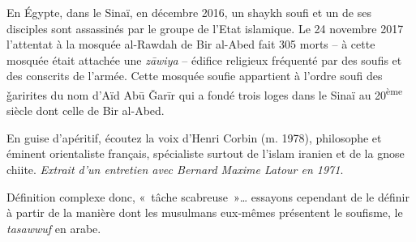 En Égypte, dans le Sinaï, en décembre 2016, un shaykh soufi et un de ses
disciples sont assassinés par le groupe de l'Etat islamique. Le 24
novembre 2017 l'attentat à la mosquée al-Rawdah de Bir al-Abed fait 305
morts -- à cette mosquée était attachée une \emph{zāwiya} -- édifice
religieux fréquenté par des soufis et des conscrits de l'armée. Cette
mosquée soufie appartient à l'ordre soufi des ǧarirites du nom d'Aïd Abū
Ǧarīr qui a fondé trois loges dans le Sinaï au 20\textsuperscript{ème}
siècle dont celle de Bir al-Abed.


En guise d'apéritif, écoutez la voix d'Henri Corbin (m. 1978),
philosophe et éminent orientaliste français, spécialiste surtout de
l'islam iranien et de la gnose chiite. \emph{Extrait d'un entretien avec
Bernard Maxime Latour en 1971}.

Définition complexe donc, «~tâche scabreuse~»\ldots{} essayons cependant
de le définir à partir de la manière dont les musulmans eux-mêmes
présentent le soufisme, le \emph{tasawwuf} en arabe.

